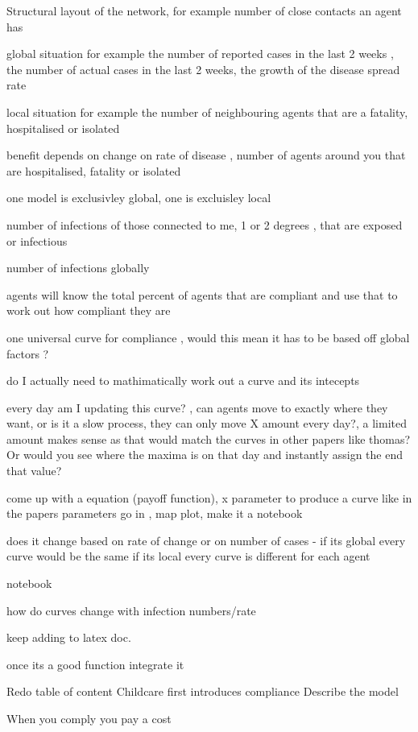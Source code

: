 \documentclass{article}
\begin{document}
Structural layout of the network, for example number of close contacts an agent has 

global situation for example the number of reported cases in the last 2 weeks , the number of actual cases in the last 2 weeks, the growth of the disease spread rate

local situation for example the number of neighbouring agents that are a fatality, hospitalised or isolated


benefit depends on change on rate of disease , number of agents around you that are hospitalised, fatality or isolated

one model is exclusivley global, one is excluisley local


number of infections of those connected to me, 1 or 2 degrees , that are exposed or infectious

number of infections globally



agents will know the total percent of agents that are compliant and use that to work out how compliant they are

one universal curve for compliance , would this mean it has to be based off global factors ?

do I actually need to mathimatically work out a curve and its intecepts 

every day am I updating this curve? , can agents move to exactly where they want, or is it a slow process, they can only move X amount every day?, a limited amount makes sense as that would match the curves in other papers like thomas?
Or would you see where the maxima is on that day and instantly assign the end that value?

come up with a equation (payoff function), x parameter to produce a curve like in the papers
parameters go in , map plot, make it a notebook

does it change based on rate of change or on number of cases - if its global every curve would be the same
if its local every curve is different for each agent

notebook

how do curves change with infection numbers/rate

keep adding to latex doc.

once its a good function integrate it 

Redo table of content
Childcare first introduces compliance
Describe the model
 
When you comply you pay a cost
\end{document}

